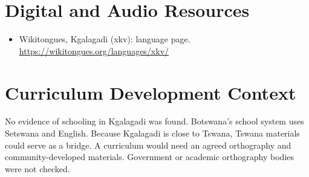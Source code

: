 \documentclass[12pt]{article}
\begin{document}
\section{Digital and Audio Resources}
\begin{itemize}
\item Wikitongues, Kgalagadi (xkv): language page. \url{https://wikitongues.org/languages/xkv/}
\end{itemize}

\section{Curriculum Development Context}
No evidence of schooling in Kgalagadi was found. Botswana's school system uses Setswana and English. Because Kgalagadi is close to Tswana, Tswana materials could serve as a bridge. A curriculum would need an agreed orthography and community-developed materials. Government or academic orthography bodies were not checked.
\end{document}
